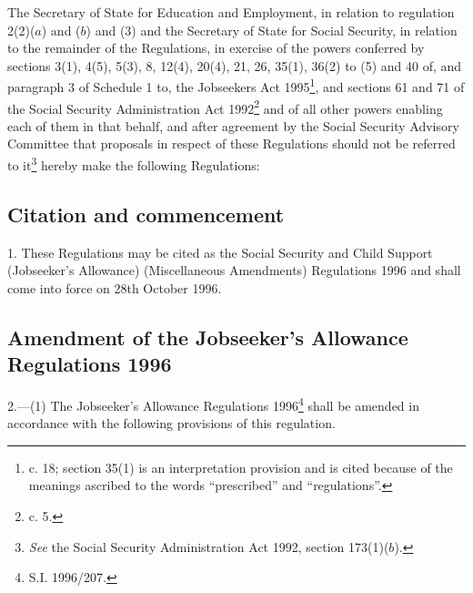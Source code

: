 \documentclass[12pt,a4paper]{article}
\title{\regstitle}
\author{S.I. 1996 No. 2538}
\date{Made 7th October 1996\\Laid before Parliament 8th October 1996\\Coming into force 28th October 1996}
\begin{document}
\maketitle

\noindent
The Secretary of State for Education and Employment, in relation to regulation 2(2)($a$) and ($b$) and (3) and the Secretary of State for Social Security, in relation to the remainder of the Regulations, in exercise of the powers conferred by sections 3(1), 4(5), 5(3), 8, 12(4), 20(4), 21, 26, 35(1), 36(2) to (5) and 40 of, and paragraph 3 of Schedule 1 to, the Jobseekers Act 1995\footnote{ c. 18; section 35(1) is an interpretation provision and is cited because of the meanings ascribed to the words “prescribed” and “regulations”.}, and sections 61 and 71 of the Social Security Administration Act 1992\footnote{ c. 5.} and of all other powers enabling each of them in that behalf, and after agreement by the Social Security Advisory Committee that proposals in respect of these Regulations should not be referred to it\footnote{\frenchspacing \emph{See} the Social Security Administration Act 1992, section 173(1)($b$).} hereby make the following Regulations:

{\sloppy

\tableofcontents

}

\setcounter{secnumdepth}{-2}

\subsection[1. Citation and commencement]{Citation and commencement}

1.  These Regulations may be cited as the Social Security and Child Support (Jobseeker’s Allowance) (Miscellaneous Amendments) Regulations 1996 and shall come into force on 28th October 1996.

\subsection[2. Amendment of the Jobseeker’s Allowance Regulations 1996]{Amendment of the Jobseeker’s Allowance Regulations 1996}

2.—(1) The Jobseeker’s Allowance Regulations 1996\footnote{\frenchspacing S.I. 1996/207.} shall be amended in accordance with the following provisions of this regulation.
\end{document}
